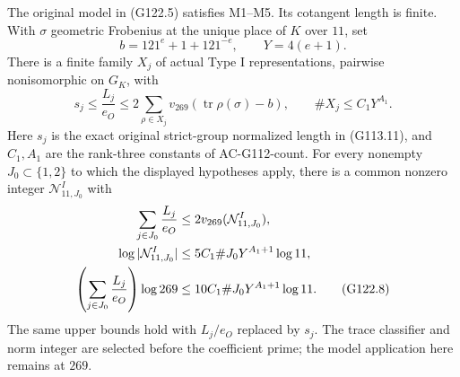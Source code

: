\begin{theorem}
\label{AC-G122-count}
The original model in (G122.5) satisfies M1--M5.  Its cotangent
length is finite.  With $\sigma$ geometric Frobenius at the unique
place of $K$ over $11$, set
\[
                   b=121^e+1+121^{-e},\qquad Y=4(e+1).
                                                        \tag{G122.6}
\]
There is a finite family $X_j$ of actual Type I representations,
pairwise nonisomorphic on $G_K$, with
\[
 s_j\le\frac{L_j}{e_O}
       \le2\sum_{\rho\in X_j}
                  v_{269}(\operatorname{tr}\rho(\sigma)-b),
       \qquad\#X_j\le C_1Y^{A_1}.
                                                        \tag{G122.7}
\]
Here $s_j$ is the exact original strict-group normalized length
in (G113.11), and $C_1,A_1$ are the rank-three constants of
AC-G112-count.  For every nonempty $J_0\subset\{1,2\}$ to which
the displayed hypotheses apply, there is a common nonzero integer
$\mathcal N^I_{11,J_0}$ with
\begin{align}
 \sum_{j\in J_0}\frac{L_j}{e_O}
    &\le2v_{269}(\mathcal N^I_{11,J_0}),\notag\\
 \log|\mathcal N^I_{11,J_0}|
    &\le5C_1\#J_0Y^{A_1+1}\log11,\notag\\
 \left(\sum_{j\in J_0}\frac{L_j}{e_O}\right)\log269
    &\le10C_1\#J_0Y^{A_1+1}\log11.
                                                        \tag{G122.8}
\end{align}
The same upper bounds hold with $L_j/e_O$ replaced by $s_j$.
The trace classifier and norm integer are selected before the
coefficient prime; the model application here remains at $269$.
\end{theorem}

